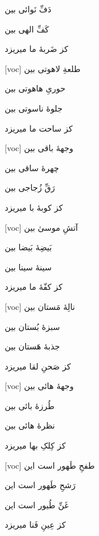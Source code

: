 \documentclass[11pt]{article}
\newenvironment{orig}
  {\begin{farsi}[voc]}
  {\end{farsi}}
\newenvironment{word}{}{}
\newcommand{\ayat}[1]{\vspace{4ex}\begin{orig}#1\end{orig}}
\begin{document}
\begin{word}
{دَفِّ نَوائی بین

کَفِّ الهی بین

کز ضَربۀ ما میریزد
}

\ayat{
طلعةِ لاهوتی بین

حوریِ هاهوتی بین

جلوۀ ناسوتی بین

کز ساحت ما میریزد
}

\ayat{
وجهۀ باقی بین

چهرۀ ساقی بین

رَقِّ زُجاجی بین

کز کوبۀ با میریزد
}

\ayat{
آتشِ موسیٰ بین

بَیضِۀ بَیضا بین

سینۀ سینا بین

کز کفّۀ ما میریزد
}

\ayat{
نالِۀ مَستان بین

سبزۀ بُستان بین

جذبۀ هَستان بین

کز صَحنِ لقا میریزد
}

\ayat{
وجهۀ هائی بین

طُرزۀ بائی بین

نظرۀ هائی بین

کز کِلکِ بها میریزد
}

\ayat{
طفحِ طَهور است این

رَشحِ طَهور است این

غَنِّ طُیور است این

کز عِینِ فَنا میریزد
}
\end{word}
\end{document}
